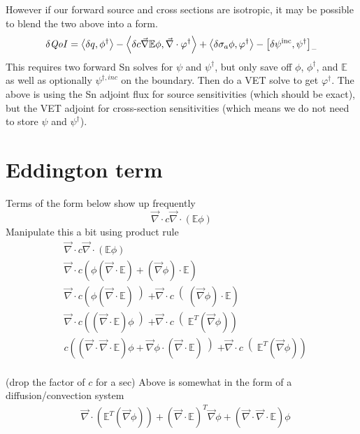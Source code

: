 \documentclass{article}
\newcommand{\bra}{\left\langle}
\newcommand{\ket}{\right\rangle}
\newcommand{\sbra}{\left[}
\newcommand{\sket}{\right]}
\renewcommand{\div}{\vec{\nabla} \cdot}
\newcommand{\grad}{\vec{\nabla}}
\newcommand{\Edd}{\mathbb{E}}
\newcommand{\isigt}{c}
\newcommand{\qoi}{{\it QoI}\xspace}
\begin{document}
However if our forward source and cross sections are isotropic, it may be possible to blend the two above into a form.
\begin{equation}
\delta \qoi = \bra \delta q , \phi^\dag \ket - \bra \delta c \grad \Edd \phi, \div \varphi^\dag \ket + \bra \delta \sigma_a \phi, \varphi^\dag \ket - \sbra \delta \psi^{\text{inc}}, \psi^\dag \sket_-
\end{equation}
This requires two forward Sn solves for $\psi$ and $\psi^\dag$, but only save off $\phi$, $\phi^\dag$, and $\Edd$ as well as optionally $\psi^{\dag,inc}$ on the boundary. Then do a VET solve to get $\varphi^\dag$. The above is using the Sn adjoint flux for source sensitivities (which should be exact), but the VET adjoint for cross-section sensitivities (which means we do not need to store $\psi$ and $\psi^\dag$).

\section{Eddington term}
Terms of the form below show up frequently
\begin{equation}
\div \isigt \div \left( \Edd \phi \right)
\end{equation}
Manipulate this a bit using product rule
\begin{equation}
\begin{split}
& \div \isigt \div \left( \Edd \phi \right) \\
& \div \isigt  \left( \phi (\div \Edd) + (\grad \phi) \cdot \Edd \right) \\
& \div \isigt  \left( \phi (\div \Edd) \left) + \div \isigt\right( (\grad \phi) \cdot \Edd \right) \\
& \div \isigt  \left( (\div \Edd) \phi  \left) + \div \isigt\right( \Edd^T (\grad \phi) \right) \\
&  \isigt  \left( (\div \div \Edd) \phi + \grad \phi \cdot  (\div \Edd) \left) + \div \isigt\right( \Edd^T (\grad \phi) \right) \\
\end{split}
\end{equation}

(drop the factor of $\isigt$ for a sec) Above is somewhat in the form of a diffusion/convection system
\begin{equation}
\begin{split}
&    \div \left( \Edd^T (\grad \phi) \right) + (\div \Edd)^T \grad \phi  +   (\div \div \Edd) \phi\\
\end{split}
\end{equation}
\end{document}
